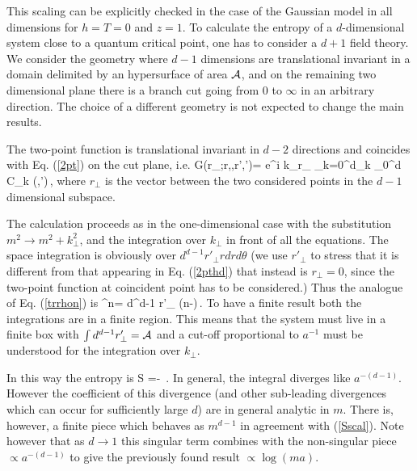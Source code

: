 \documentclass[preprint,aps]{revtex4}
\begin{document}
This scaling can be explicitly checked in the case of the Gaussian
model in all dimensions for $h=T=0$ and $z=1$.
To calculate the entropy of a $d$-dimensional system
close to a quantum critical point, one has to consider a $d+1$ field theory.
We consider the geometry where $d-1$ dimensions are translational invariant
in a domain delimited by an hypersurface of area $\cal A$,
and on the remaining two dimensional plane there is a branch cut going
from 0 to $\infty$ in an arbitrary direction.
The choice of a different geometry is not expected to change the main results.

The two-point function is translational invariant in $d-2$ directions and
coincides with Eq. (\ref{2pt}) on the cut plane, i.e.
\be
G(r_\perp;r,\theta,r',\theta')=
\int {} e^{i k_\perp r_\perp}
 \sum_{k=0}^\infty d_k \int_0^\infty \lambda d\lambda
{}
{\cal C}_k (\theta,\theta')\,,
\label{2pthd}
\ee
where $r_\perp$ is the vector between the two considered points in the
$d-1$ dimensional subspace.

The calculation proceeds as in the one-dimensional case with the substitution
$m^2\rightarrow m^2+k_\perp^2$, and the integration over $k_\perp$ in front
of all the equations. The space integration is obviously over
$d^{d-1}r'_\perp r dr d\theta$ (we use $r'_\perp$ to stress that it is
different from that appearing in Eq. (\ref{2pthd}) that instead is
$r_\perp=0$, since the two-point function at coincident point has to be
considered.)
Thus the analogue of Eq. (\ref{trrhon}) is
\be
{} \rho^n=
\int d^{d-1} r'_\perp \int {}
\left(n-\right)\,.
\ee
To have a finite result both the integrations are in a finite region.
This means that the system must live in a finite box with
$\int d^{d-1} r'_\perp={\cal A}$ and a cut-off proportional to $a^{-1}$
must be understood for the integration over $k_\perp$.


In this way the entropy is
\be
S%
=- \int {}
\log{}\,.
\label{Sd}
\ee
In general, the integral diverges like $a^{-(d-1)}$. However the
coefficient of this divergence (and other sub-leading divergences which
can occur for sufficiently large $d$) are in general analytic in $m$.
There is, however, a finite piece which behaves as $m^{d-1}$ in
agreement with (\ref{Sscal}). Note however that as $d\to1$ this singular
term combines with the non-singular piece $\propto a^{-(d-1)}$ to give
the previously found result $\propto\log(ma)$.
\end{document}
